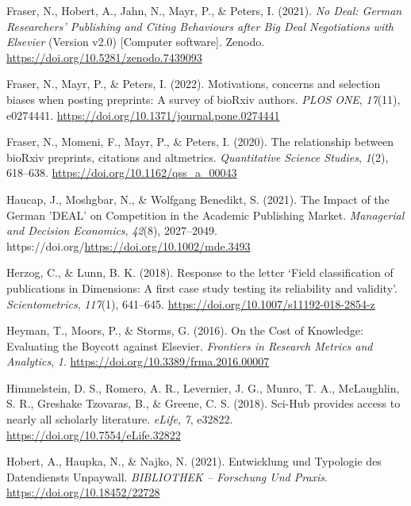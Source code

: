 \documentclass[
]{article}
\newlength{\cslhangindent}
\newlength{\cslentryspacingunit} %
\newenvironment{CSLReferences}[2] %
 {%
  \setlength{\parindent}{0pt}
  \ifodd #1
  \let\oldpar\par
  \def\par{\hangindent=\cslhangindent\oldpar}
  \fi
  \setlength{\parskip}{#2\cslentryspacingunit}
 }%
 {}
\begin{document}
\begin{CSLReferences}{1}{0}
\leavevmode{}%
Fraser, N., Hobert, A., Jahn, N., Mayr, P., \& Peters, I. (2021). \emph{{No Deal: German Researchers' Publishing and Citing Behaviours after Big Deal Negotiations with Elsevier}} (Version v2.0) {[}Computer software{]}. Zenodo. \url{https://doi.org/10.5281/zenodo.7439093}

\leavevmode{}%
Fraser, N., Mayr, P., \& Peters, I. (2022). Motivations, concerns and selection biases when posting preprints: {A} survey of {bioRxiv} authors. \emph{PLOS ONE}, \emph{17}(11), e0274441. \url{https://doi.org/10.1371/journal.pone.0274441}

\leavevmode{}%
Fraser, N., Momeni, F., Mayr, P., \& Peters, I. (2020). {The relationship between bioRxiv preprints, citations and altmetrics}. \emph{Quantitative Science Studies}, \emph{1}(2), 618--638. \url{https://doi.org/10.1162/qss_a_00043}

\leavevmode{}%
Haucap, J., Moshgbar, N., \& Wolfgang Benedikt, S. (2021). The {Impact} of the {German} '{DEAL}' on {Competition} in the {Academic} {Publishing} {Market}. \emph{Managerial and Decision Economics}, \emph{42}(8), 2027--2049. https://doi.org/\url{https://doi.org/10.1002/mde.3493}

\leavevmode{}%
Herzog, C., \& Lunn, B. K. (2018). Response to the letter {`{Field} classification of publications in {Dimensions}: A first case study testing its reliability and validity'}. \emph{Scientometrics}, \emph{117}(1), 641--645. \url{https://doi.org/10.1007/s11192-018-2854-z}

\leavevmode{}%
Heyman, T., Moors, P., \& Storms, G. (2016). On the {Cost} of {Knowledge}: {Evaluating} the {Boycott} against {Elsevier}. \emph{Frontiers in Research Metrics and Analytics}, \emph{1}. \url{https://doi.org/10.3389/frma.2016.00007}

\leavevmode{}%
Himmelstein, D. S., Romero, A. R., Levernier, J. G., Munro, T. A., McLaughlin, S. R., Greshake Tzovaras, B., \& Greene, C. S. (2018). Sci-{Hub} provides access to nearly all scholarly literature. \emph{eLife}, \emph{7}, e32822. \url{https://doi.org/10.7554/eLife.32822}

\leavevmode{}%
Hobert, A., Haupka, N., \& Najko, N. (2021). Entwicklung und {Typologie} des {Datendiensts} {Unpaywall}. \emph{BIBLIOTHEK -- Forschung Und Praxis}. \url{https://doi.org/10.18452/22728}


\end{CSLReferences}
\end{document}
